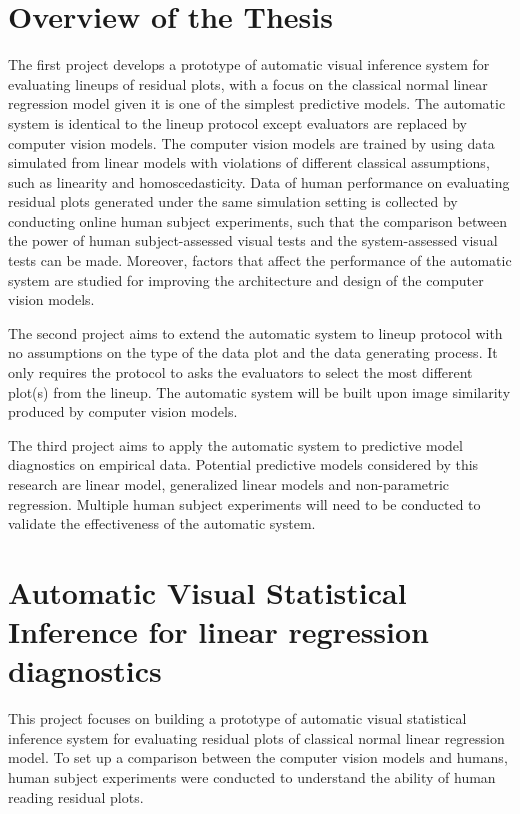 \documentclass{monashthesis}
\theoremstyle{definition}
\theoremstyle{definition}
\theoremstyle{definition}
\theoremstyle{definition}
\theoremstyle{remark}
\begin{document}
\hypertarget{se:overview}{%
\chapter{Overview of the Thesis}\label{se:overview}}

The first project develops a prototype of automatic visual inference system for evaluating lineups of residual plots, with a focus on the classical normal linear regression model given it is one of the simplest predictive models. The automatic system is identical to the lineup protocol except evaluators are replaced by computer vision models. The computer vision models are trained by using data simulated from linear models with violations of different classical assumptions, such as linearity and homoscedasticity. Data of human performance on evaluating residual plots generated under the same simulation setting is collected by conducting online human subject experiments, such that the comparison between the power of human subject-assessed visual tests and the system-assessed visual tests can be made. Moreover, factors that affect the performance of the automatic system are studied for improving the architecture and design of the computer vision models.

The second project aims to extend the automatic system to lineup protocol with no assumptions on the type of the data plot and the data generating process. It only requires the protocol to asks the evaluators to select the most different plot(s) from the lineup. The automatic system will be built upon image similarity produced by computer vision models.

The third project aims to apply the automatic system to predictive model diagnostics on empirical data. Potential predictive models considered by this research are linear model, generalized linear models and non-parametric regression. Multiple human subject experiments will need to be conducted to validate the effectiveness of the automatic system.

\hypertarget{se:project-1}{%
\chapter{Automatic Visual Statistical Inference for linear regression diagnostics}\label{se:project-1}}

This project focuses on building a prototype of automatic visual statistical inference system for evaluating residual plots of classical normal linear regression model. To set up a comparison between the computer vision models and humans, human subject experiments were conducted to understand the ability of human reading residual plots.
\end{document}
